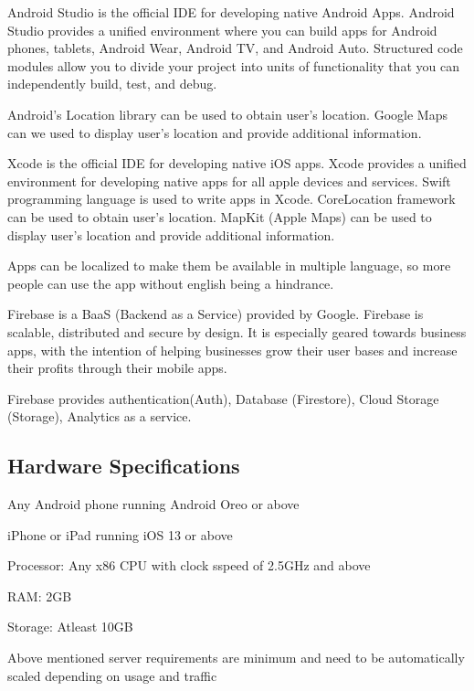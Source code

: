\documentclass[../Report.tex]{subfiles}
\begin{document}
\begin{description}
  \item[Android Studio: ] Android Studio is the official IDE for developing native Android Apps. Android Studio provides a unified  
  environment where you can build apps for Android phones, tablets, Android Wear, Android TV, and Android Auto. Structured code modules 
  allow you to  divide your project into units of functionality that you can independently build, test, and debug.\par
  Android's Location library can be used to obtain user's location. Google Maps can we used to display user's location and provide 
  additional information.

  \item[Xcode: ] Xcode is the official IDE for developing native iOS apps. Xcode provides a unified environment for developing native apps 
  for all apple devices and services. Swift programming language is used to write apps in Xcode. CoreLocation framework can be used to 
  obtain user's location. MapKit (Apple Maps) can be used to display user's location and provide additional information.\par

  \item Apps can be localized to make them be available in multiple language, so more people can use the app without english being a 
  hindrance.

  \item[Firebase: ] Firebase is a BaaS (Backend as a Service) provided by Google. Firebase is scalable, distributed and secure by design. It is especially
  geared towards business apps, with the intention of helping businesses grow their user bases and increase their profits through their mobile apps.\par
  Firebase provides authentication(Auth), Database (Firestore), Cloud Storage (Storage), Analytics as a service.
\end{description}

\subsection{Hardware Specifications}
\begin{description}
  \item[User Device Requirements: ]
  \item Any Android phone running Android Oreo or above
  \item iPhone or iPad running iOS 13 or above
  \item 
  
  \item [Minimum Server Requirements: ]
  \item Processor: Any x86 CPU with clock sspeed of 2.5GHz and above
  \item RAM: 2GB
  \item Storage: Atleast 10GB
\end{description}
Above mentioned server requirements are minimum and need to be automatically scaled depending on usage and traffic
\end{document}
